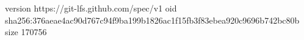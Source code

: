 version https://git-lfs.github.com/spec/v1
oid sha256:376aeae4ac90d767c94f9ba199b1826ac1f15fb3f83ebea920c9696b742bc80b
size 170756
